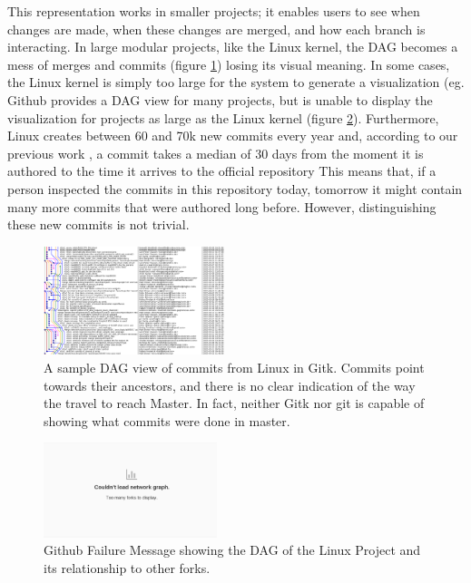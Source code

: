 \documentclass[conference, draftclsnofoot, draft]{IEEEtran}
\begin{document}
This representation works in smaller projects; it enables users to see
when changes are made, when these changes are merged, and how each branch is
interacting.  
In large modular projects, like the Linux kernel, the DAG becomes a
mess of merges and commits (figure \ref{fig:gitk}) losing its visual meaning.  In
some cases, the Linux kernel is simply too large for the system to generate a
visualization (eg. Github provides a DAG view for many projects, but is unable to
display the visualization for projects as large as the Linux kernel (figure
\ref{fig:gitfail}).
Furthermore, Linux creates between 60 and 70k new commits every year and, according to our previous work \cite{German2015}, 
a commit takes a median of 30 days from the moment it is authored to the time it arrives to the official repository
This means that, if a person inspected the commits in this repository today, tomorrow it might contain  many more
commits that were authored long before. However, distinguishing these new commits is not trivial. 

\begin{figure}
        \centering
        \includegraphics[width=0.47\textwidth]{figures/gitk.png}
        \caption{A sample DAG view of commits from Linux in Gitk. Commits point towards their ancestors, and there is no clear indication of the way the travel
          to reach Master. In fact, neither Gitk nor git is capable of showing what commits were done in master.}
        \label{fig:gitk}
\end{figure}

\begin{figure}
        \centering
        \includegraphics[width=0.45\textwidth]{figures/github_viewer.png}
        \caption{Github Failure Message showing the DAG of the Linux Project and its relationship to other forks.}
        \label{fig:gitfail}
\end{figure}
\end{document}

